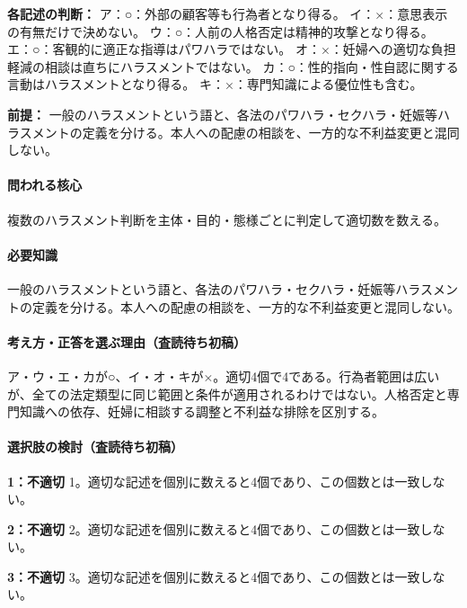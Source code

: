 \noindent\textbf{各記述の判断：} ア：○：外部の顧客等も行為者となり得る。 イ：×：意思表示の有無だけで決めない。 ウ：○：人前の人格否定は精神的攻撃となり得る。 エ：○：客観的に適正な指導はパワハラではない。 オ：×：妊婦への適切な負担軽減の相談は直ちにハラスメントではない。 カ：○：性的指向・性自認に関する言動はハラスメントとなり得る。 キ：×：専門知識による優位性も含む。\par

\noindent\textbf{前提：} 一般のハラスメントという語と、各法のパワハラ・セクハラ・妊娠等ハラスメントの定義を分ける。本人への配慮の相談を、一方的な不利益変更と混同しない。\par

\paragraph{問われる核心} 複数のハラスメント判断を主体・目的・態様ごとに判定して適切数を数える。

\paragraph{必要知識} 一般のハラスメントという語と、各法のパワハラ・セクハラ・妊娠等ハラスメントの定義を分ける。本人への配慮の相談を、一方的な不利益変更と混同しない。

\paragraph{考え方・正答を選ぶ理由（査読待ち初稿）} ア・ウ・エ・カが○、イ・オ・キが×。適切4個で4である。行為者範囲は広いが、全ての法定類型に同じ範囲と条件が適用されるわけではない。人格否定と専門知識への依存、妊婦に相談する調整と不利益な排除を区別する。

\paragraph{選択肢の検討（査読待ち初稿）}\mbox{}\par

\noindent\textbf{1：不適切} 1。適切な記述を個別に数えると4個であり、この個数とは一致しない。\par

\noindent\textbf{2：不適切} 2。適切な記述を個別に数えると4個であり、この個数とは一致しない。\par

\noindent\textbf{3：不適切} 3。適切な記述を個別に数えると4個であり、この個数とは一致しない。\par

